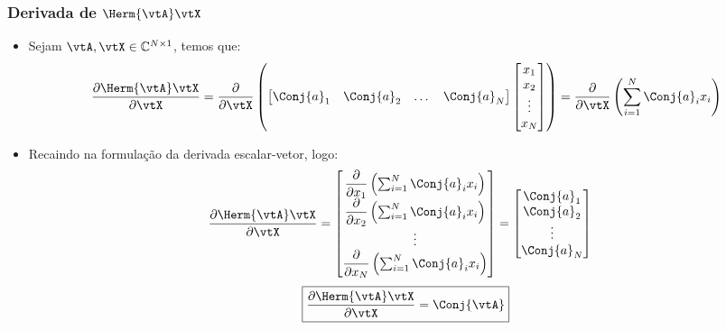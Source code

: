 \begin{frame}
	\frametitle{\normalsize Derivada de $\Herm{\vtA} \vtX$}
	\begin{itemize}
		\item Sejam $\vtA, \vtX \in \mathbb{C}^{N \times 1}$, temos que:
		{\tiny
		\begin{align*}
			\dfrac{\partial \Herm{\vtA} \vtX}{\partial \vtX} &= \dfrac{\partial}{\partial \vtX} \left(
			\begin{bmatrix}
				\Conj{a}_1 & \Conj{a}_2 & \dots & \Conj{a}_N
			\end{bmatrix} \begin{bmatrix}
				x_{1} \\ x_{2} \\ \vdots \\ x_{N}
			\end{bmatrix} \right) 
			= \frac{\partial}{\partial \vtX} \left( \sum_{i = 1}^N \Conj{a}_ix_i \right) \\
		\end{align*}}
		\item Recaindo na formulação da derivada escalar-vetor, logo:
		{\tiny
		\begin{align*}
			\frac{\partial \Herm{\vtA} \vtX}{\partial \vtX} &= \begin{bmatrix}
				\dfrac{\partial}{\partial x_1} \left( \sum_{i = 1}^N \Conj{a}_ix_i \right) \\ \dfrac{\partial}{\partial x_2} \left( \sum_{i = 1}^N \Conj{a}_ix_i \right) \\ \vdots \\ \dfrac{\partial}{\partial x_N} \left( \sum_{i = 1}^N \Conj{a}_ix_i \right) 
			\end{bmatrix}
			= \begin{bmatrix}
				\Conj{a}_1 \\ \Conj{a}_2 \\ \vdots \\ \Conj{a}_N
			\end{bmatrix}
		\end{align*}}
		\[
			\boxed{\frac{\partial \Herm{\vtA} \vtX}{\partial \vtX} = \Conj{\vtA}}
		\]
	\end{itemize}
\end{frame}

